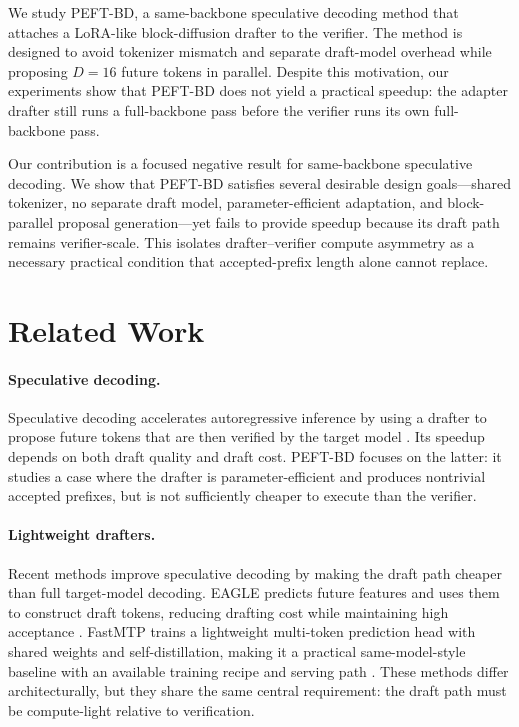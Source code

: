 \documentclass[11pt]{article}
\begin{document}
We study PEFT-BD, a same-backbone speculative decoding method that attaches a LoRA-like block-diffusion drafter to the verifier. The method is designed to avoid tokenizer mismatch and separate draft-model overhead while proposing $D=16$ future tokens in parallel. Despite this motivation, our experiments show that PEFT-BD does not yield a practical speedup: the adapter drafter still runs a full-backbone pass before the verifier runs its own full-backbone pass.

Our contribution is a focused negative result for same-backbone speculative decoding. We show that PEFT-BD satisfies several desirable design goals---shared tokenizer, no separate draft model, parameter-efficient adaptation, and block-parallel proposal generation---yet fails to provide speedup because its draft path remains verifier-scale. This isolates drafter--verifier compute asymmetry as a necessary practical condition that accepted-prefix length alone cannot replace.


\section{Related Work}

\paragraph{Speculative decoding.}
Speculative decoding accelerates autoregressive inference by using a drafter to propose future tokens that are then verified by the target model \citep{leviathan2023fast,chen2023accelerating}. Its speedup depends on both draft quality and draft cost. PEFT-BD focuses on the latter: it studies a case where the drafter is parameter-efficient and produces nontrivial accepted prefixes, but is not sufficiently cheaper to execute than the verifier.

\paragraph{Lightweight drafters.}
Recent methods improve speculative decoding by making the draft path cheaper than full target-model decoding. EAGLE predicts future features and uses them to construct draft tokens, reducing drafting cost while maintaining high acceptance \citep{eagle,eagle2,eagle3}. FastMTP trains a lightweight multi-token prediction head with shared weights and self-distillation, making it a practical same-model-style baseline with an available training recipe and serving path \citep{fastmtp}. These methods differ architecturally, but they share the same central requirement: the draft path must be compute-light relative to verification.
\end{document}
